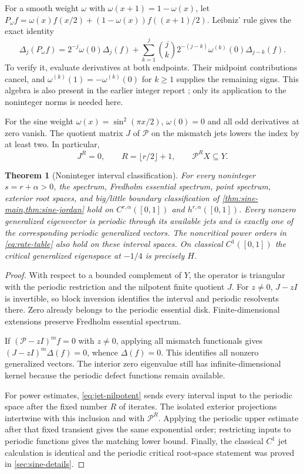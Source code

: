 \documentclass[11pt,a4paper]{article}
\numberwithin{equation}{section}
\newtheorem{theorem}{Theorem}[section]
\theoremstyle{definition}
\theoremstyle{remark}
\newcommand{\Pp}{\mathcal P}
\begin{document}
For a smooth weight $\omega$ with $\omega(x+1)=1-\omega(x)$, let
$P_\omega f=\omega(x)f(x/2)+(1-\omega(x))f((x+1)/2)$.
Leibniz' rule gives the exact identity
\begin{equation}
 \Delta_j(P_\omega f)=2^{-j}\omega(0)\Delta_j(f)
 +\sum_{k=1}^j\binom jk2^{-(j-k)}
 \omega^{(k)}(0)\Delta_{j-k}(f).
 \label{eq:jet-recurrence}
\end{equation}
To verify it, evaluate derivatives at both endpoints. Their midpoint
contributions cancel, and
$\omega^{(k)}(1)=-\omega^{(k)}(0)$ for $k\ge1$ supplies the
remaining signs. This algebra is also present in the earlier integer
report \cite{repo-cr}; only its application to the noninteger norms
is needed here.

For the sine weight $\omega(x)=\sin^2(\pi x/2)$, $\omega(0)=0$
and all odd derivatives at zero vanish. The quotient matrix $J$ of
$\Pp$ on the mismatch jets lowers the index by at least two. In
particular,
\begin{equation}
 J^R=0,\qquad R=\lfloor r/2\rfloor+1,
 \qquad \Pp^R X\subseteq Y.
 \label{eq:jet-nilpotent}
\end{equation}

\begin{theorem}[Noninteger interval classification]
\label{thm:interval}
For every noninteger $s=r+\alpha>0$, the spectrum, Fredholm essential
spectrum, point spectrum, exterior root spaces, and big/little boundary
classification of \cref{thm:sine-main,thm:sine-jordan} hold on
$C^{r,\alpha}([0,1])$ and $h^{r,\alpha}([0,1])$.
Every nonzero generalized eigenvector is periodic through its available
jets and is exactly one of the corresponding periodic generalized
vectors. The noncritical power orders in \eqref{eq:rate-table} also
hold on these interval spaces. On classical $C^1([0,1])$ the critical
generalized eigenspace at $-1/4$ is precisely $H$.
\end{theorem}
\begin{proof}
With respect to a bounded complement of $Y$, the operator is triangular
with the periodic restriction and the nilpotent finite quotient $J$.
For $z\ne0$, $J-zI$ is invertible, so block inversion identifies the
interval and periodic resolvents there. Zero already belongs to the
periodic essential disk. Finite-dimensional extensions preserve
Fredholm essential spectrum.

If $(\Pp-zI)^mf=0$ with $z\ne0$, applying all mismatch functionals
gives $(J-zI)^m\Delta(f)=0$, whence $\Delta(f)=0$. This identifies
all nonzero generalized vectors. The interior zero eigenvalue still
has infinite-dimensional kernel because the periodic defect functions
remain available.

For power estimates, \eqref{eq:jet-nilpotent} sends every interval
input to the periodic space after the fixed number $R$ of iterates.
The isolated exterior projections intertwine with this inclusion and
with $\Pp^R$. Applying the periodic upper estimate after that fixed
transient gives the same exponential order; restricting inputs to
periodic functions gives the matching lower bound. Finally, the
classical $C^1$ jet calculation is identical and the periodic critical
root-space statement was proved in \cref{sec:sine-details}.
\end{proof}
\end{document}
